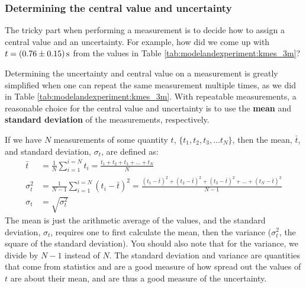 \subsubsection{Determining the central value and uncertainty}
The tricky part when performing a measurement is to decide how to assign a central value and an uncertainty. For example, how did we come up with $t=\SI{0.76 \pm 0.15}{s}$ from the values in Table \ref{tab:modelandexperiment:kmes_3m}? 

Determining the uncertainty and central value on a measurement is greatly simplified when one can repeat the same measurement multiple times, as we did in Table \ref{tab:modelandexperiment:kmes_3m}. With repeatable measurements, a reasonable choice for the central value and uncertainty is to use the \textbf{mean} and \textbf{standard deviation} of the measurements, respectively.

If we have $N$ measurements of some quantity $t$, $\{t_1, t_2, t_3, \dots t_N\}$, then the mean, $\bar t$, and standard deviation, $\sigma_t$, are defined as:
\begin{align}
\bar t &= \frac{1}{N}\sum_{i=1}^{i=N} t_i=\frac{t_1 +t_2 +t_3 +\dots+ t_N}{N} \\
\sigma_t^2 &=\frac{1}{N-1}\sum_{i=1}^{i=N}(t_i-\bar t)^2 = \frac{(t_1-\bar t)^2+(t_2-\bar t)^2+(t_3-\bar t)^2+\dots+(t_N-\bar t)^2}{N-1} \\
\sigma_t &=\sqrt{\sigma_t^2}
\end{align}
The mean is just the arithmetic average of the values, and the standard deviation, $\sigma_t$, requires one to first calculate the mean, then the variance ($\sigma^2_t$, the square of the standard deviation). You should also note that for the variance, we divide by $N-1$ instead of $N$. The standard deviation and variance are quantities that come from statistics and are a good measure of how spread out the values of $t$ are about their mean, and are thus a good measure of the uncertainty.

